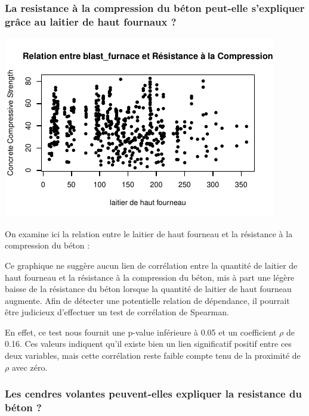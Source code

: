 \documentclass[
  12pt,
]{article}
\begin{document}
\subsubsection{La resistance à la compression du béton peut-elle
s'expliquer grâce au laitier de haut fournaux
?}\label{la-resistance-uxe0-la-compression-du-buxe9ton-peut-elle-sexpliquer-gruxe2ce-au-laitier-de-haut-fournaux}

\begin{center}\includegraphics{rmd_final_files/figure-latex/unnamed-chunk-14-1} \end{center}

On examine ici la relation entre le laitier de haut fourneau et la
résistance à la compression du béton :

Ce graphique ne suggère aucun lien de corrélation entre la quantité de
laitier de haut fourneau et la résistance à la compression du béton, mis
à part une légère baisse de la résistance du béton lorsque la quantité
de laitier de haut fourneau augmente. Afin de détecter une potentielle
relation de dépendance, il pourrait être judicieux d'effectuer un test
de corrélation de Spearman.

En effet, ce test nous fournit une p-value inférieure à 0.05 et un
coefficient \(\rho\) de 0.16. Ces valeurs indiquent qu'il existe bien un
lien significatif positif entre ces deux variables, mais cette
corrélation reste faible compte tenu de la proximité de \(\rho\) avec
zéro.

\subsubsection{Les cendres volantes peuvent-elles expliquer la
resistance du béton
?}\label{les-cendres-volantes-peuvent-elles-expliquer-la-resistance-du-buxe9ton}
\end{document}

